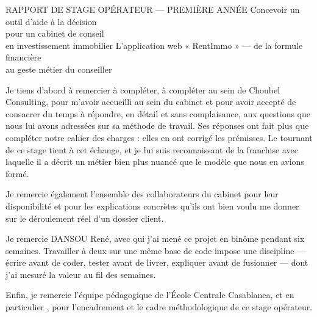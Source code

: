 \documentclass[12pt,a4paper]{article}
\newcommand{\entreprise}{Choubel Consulting}
\newcommand{\tuteurnom}{à compléter}
\newcommand{\tuteurfonction}{à compléter}
\newcommand{\binome}{DANSOU René}
\begin{document}
\couverturestage
	{RAPPORT DE STAGE OPÉRATEUR --- PREMIÈRE ANNÉE}
	{Concevoir un outil d'aide à la décision\\ pour un cabinet de conseil\\ en investissement immobilier}
	{L'application web « RentImmo » --- de la formule financière\\ au geste métier du conseiller}

\newpage
{}
\setcounter{page}{1}


Je tiens d'abord à remercier \tuteurnom, \tuteurfonction{} au sein de
\entreprise, pour m'avoir accueilli au sein du cabinet et pour avoir accepté de
consacrer du temps à répondre, en détail et sans complaisance, aux questions que
nous lui avons adressées sur sa méthode de travail. Ses réponses ont fait plus
que compléter notre cahier des charges : elles en ont corrigé les prémisses. Le
tournant de ce stage tient à cet échange, et je lui suis reconnaissant de la
franchise avec laquelle il a décrit un métier bien plus nuancé que le modèle que
nous en avions formé.

Je remercie également l'ensemble des collaborateurs du cabinet
 pour leur disponibilité
et pour les explications concrètes qu'ils ont bien voulu me donner sur le
déroulement réel d'un dossier client.

Je remercie \binome, avec qui j'ai mené ce projet en binôme pendant six
semaines. Travailler à deux sur une même base de code impose une discipline —
écrire avant de coder, tester avant de livrer, expliquer avant de fusionner —
dont j'ai mesuré la valeur au fil des semaines.

Enfin, je remercie l'équipe pédagogique de l'École Centrale Casablanca, et en
particulier , pour l'encadrement et le
cadre méthodologique de ce stage opérateur.


\newcommand{\glossaire}[2]{%
	\begin{table}[H]
		\centering
		\small
		\setstretch{1.05}
		\renewcommand{\arraystretch}{1.40}
		\begin{tabular}{|>{\bfseries\raggedright\arraybackslash}p{3.7cm}|>{\raggedright\arraybackslash}p{11.1cm}|}
			\hline
			\rowcolor{eccblue!15}
			\multicolumn{2}{|l|}{\textbf{\color{eccblue}#1}} \\
			\hline
			#2
		\end{tabular}
	\end{table}}
\end{document}

